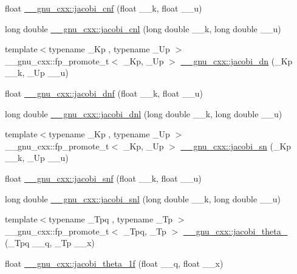 \begin{DoxyCompactItemize}
\item 
float \hyperlink{group__mathsf__gnu_gadbd6320123f45ae10d539cf8df0373cd}{\+\_\+\+\_\+gnu\+\_\+cxx\+::jacobi\+\_\+cnf} (float \+\_\+\+\_\+k, float \+\_\+\+\_\+u)
\item 
long double \hyperlink{group__mathsf__gnu_ga08892965ea520116cc53a764513fe685}{\+\_\+\+\_\+gnu\+\_\+cxx\+::jacobi\+\_\+cnl} (long double \+\_\+\+\_\+k, long double \+\_\+\+\_\+u)
\item 
{\footnotesize template$<$typename \+\_\+\+Kp , typename \+\_\+\+Up $>$ }\\\+\_\+\+\_\+gnu\+\_\+cxx\+::fp\+\_\+promote\+\_\+t$<$ \+\_\+\+Kp, \+\_\+\+Up $>$ \hyperlink{group__mathsf__gnu_ga0f8fa8d6a77dbc2089d65f3f16876aa9}{\+\_\+\+\_\+gnu\+\_\+cxx\+::jacobi\+\_\+dn} (\+\_\+\+Kp \+\_\+\+\_\+k, \+\_\+\+Up \+\_\+\+\_\+u)
\item 
float \hyperlink{group__mathsf__gnu_gae96327d678adc6b5c4051f1c3649549a}{\+\_\+\+\_\+gnu\+\_\+cxx\+::jacobi\+\_\+dnf} (float \+\_\+\+\_\+k, float \+\_\+\+\_\+u)
\item 
long double \hyperlink{group__mathsf__gnu_gae59786991abbf8359deef49b6323065a}{\+\_\+\+\_\+gnu\+\_\+cxx\+::jacobi\+\_\+dnl} (long double \+\_\+\+\_\+k, long double \+\_\+\+\_\+u)
\item 
{\footnotesize template$<$typename \+\_\+\+Kp , typename \+\_\+\+Up $>$ }\\\+\_\+\+\_\+gnu\+\_\+cxx\+::fp\+\_\+promote\+\_\+t$<$ \+\_\+\+Kp, \+\_\+\+Up $>$ \hyperlink{group__mathsf__gnu_ga49d5e18152dd0dd0f496b8c8582e7045}{\+\_\+\+\_\+gnu\+\_\+cxx\+::jacobi\+\_\+sn} (\+\_\+\+Kp \+\_\+\+\_\+k, \+\_\+\+Up \+\_\+\+\_\+u)
\item 
float \hyperlink{group__mathsf__gnu_ga5981245b7343da6e21d445bb01fdba9c}{\+\_\+\+\_\+gnu\+\_\+cxx\+::jacobi\+\_\+snf} (float \+\_\+\+\_\+k, float \+\_\+\+\_\+u)
\item 
long double \hyperlink{group__mathsf__gnu_ga1c13539e3b051a07b1c28aa8a0aeb1b4}{\+\_\+\+\_\+gnu\+\_\+cxx\+::jacobi\+\_\+snl} (long double \+\_\+\+\_\+k, long double \+\_\+\+\_\+u)
\item 
{\footnotesize template$<$typename \+\_\+\+Tpq , typename \+\_\+\+Tp $>$ }\\\+\_\+\+\_\+gnu\+\_\+cxx\+::fp\+\_\+promote\+\_\+t$<$ \+\_\+\+Tpq, \+\_\+\+Tp $>$ \hyperlink{group__mathsf__gnu_ga996ca8c1fff75e2d4f196e99e0919933}{\+\_\+\+\_\+gnu\+\_\+cxx\+::jacobi\+\_\+theta\+\_} (\+\_\+\+Tpq \+\_\+\+\_\+q, \+\_\+\+Tp \+\_\+\+\_\+x)
\item 
float \hyperlink{group__mathsf__gnu_gacccd2107c26e39400e589a59e0af674a}{\+\_\+\+\_\+gnu\+\_\+cxx\+::jacobi\+\_\+theta\+\_\+1f} (float \+\_\+\+\_\+q, float \+\_\+\+\_\+x)

\end{DoxyCompactItemize}
